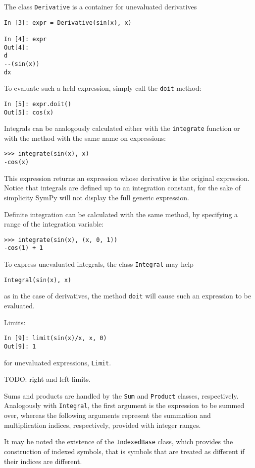 The class \verb|Derivative| is a container for unevaluated derivatives

\begin{verbatim}
In [3]: expr = Derivative(sin(x), x)

In [4]: expr
Out[4]: 
d         
--(sin(x))
dx        
\end{verbatim}

To evaluate such a held expression, simply call the \verb|doit| method:

\begin{verbatim}
In [5]: expr.doit()
Out[5]: cos(x)
\end{verbatim}

Integrals can be analogously calculated either with the \verb|integrate| function
or with the method with the same name on expressions:
\begin{verbatim}
>>> integrate(sin(x), x)
-cos(x)
\end{verbatim}
This expression returns an expression whose derivative is the original expression.
Notice that integrals are defined up to an integration constant,
for the sake of simplicity SymPy will not display the full generic expression.

Definite integration can be calculated with the same method, by specifying a
range of the integration variable:
\begin{verbatim}
>>> integrate(sin(x), (x, 0, 1))
-cos(1) + 1
\end{verbatim}

To express unevaluated integrals, the class \verb|Integral| may help
\begin{verbatim}
Integral(sin(x), x)
\end{verbatim}
as in the case of derivatives, the method \verb|doit| will cause such an expression
to be evaluated.

Limits:
\begin{verbatim}
In [9]: limit(sin(x)/x, x, 0)
Out[9]: 1
\end{verbatim}
for unevaluated expressions, \verb|Limit|.

TODO: right and left limits.

Sums and products are handled by the \texttt{Sum} and \texttt{Product} classes,
respectively.
Analogously with \texttt{Integral}, the first argument is the expression to be
summed over, whereas the following arguments represent the summation and 
multiplication indices, respectively, provided with integer ranges.

It may be noted the existence of the \texttt{IndexedBase} class,
which provides the construction of indexed symbols, that is symbols that are
treated as different if their indices are different.



